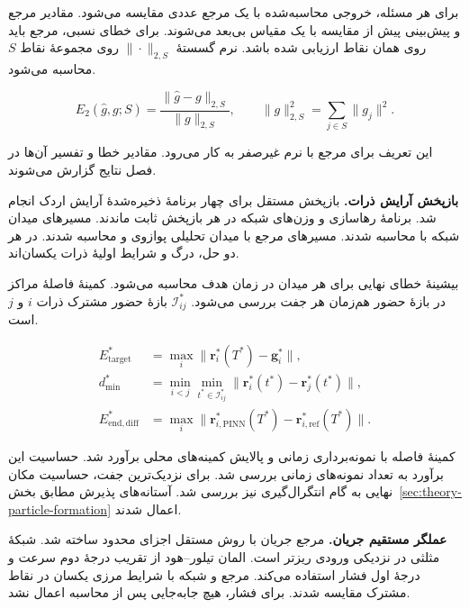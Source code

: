 \label{sec:theory-validation-metrics}

برای هر مسئله، خروجی محاسبه‌شده با یک مرجع عددی مقایسه می‌شود.
مقادیر مرجع و پیش‌بینی پیش از مقایسه با یک مقیاس بی‌بعد می‌شوند.
برای خطای نسبی، مرجع باید روی همان نقاط ارزیابی شده باشد.
نرم گسستهٔ $\|\cdot\|_{2,S}$ روی مجموعهٔ نقاط $S$ محاسبه می‌شود.

\begin{equation}
E_2(\widehat g,g;S)=
\frac{\|\widehat g-g\|_{2,S}}{\|g\|_{2,S}},
\qquad
\|g\|_{2,S}^2=\sum_{j\in S}\|g_j\|^2.
\label{eq:validation-relative-l2}
\end{equation}

این تعریف برای مرجع با نرم غیرصفر به کار می‌رود.
مقادیر خطا و تفسیر آن‌ها در فصل نتایج گزارش می‌شوند.

\textbf{بازپخش آرایش ذرات.}
بازپخش مستقل برای چهار برنامهٔ ذخیره‌شدهٔ آرایش اردک انجام شد.
برنامهٔ رهاسازی و وزن‌های شبکه در هر بازپخش ثابت ماندند.
مسیرهای میدان شبکه با  محاسبه شدند.
مسیرهای مرجع با میدان تحلیلی پوازوی و  محاسبه شدند.
در هر دو حل، درگ و شرایط اولیهٔ ذرات یکسان‌اند.

بیشینهٔ خطای نهایی برای هر میدان در زمان هدف محاسبه می‌شود.
کمینهٔ فاصلهٔ مراکز در بازهٔ حضور هم‌زمان هر جفت بررسی می‌شود.
$\mathcal I_{ij}^*$ بازهٔ حضور مشترک ذرات $i$ و $j$ است.

\begin{equation}
\begin{aligned}
E_{\mathrm{target}}^*
&=\max_i\|\mathbf r_i^*(T^*)-\mathbf g_i^*\|,\\
d_{\min}^*
&=\min_{i<j}\min_{t^*\in\mathcal I_{ij}^*}
  \|\mathbf r_i^*(t^*)-\mathbf r_j^*(t^*)\|,\\
E_{\mathrm{end,diff}}^*
&=\max_i\|\mathbf r_{i,\mathrm{PINN}}^*(T^*)
           -\mathbf r_{i,\mathrm{ref}}^*(T^*)\|.
\end{aligned}
\label{eq:validation-formation-errors}
\end{equation}

کمینهٔ فاصله با نمونه‌برداری زمانی و پالایش کمینه‌های محلی برآورد شد.
حساسیت این برآورد به تعداد نمونه‌های زمانی بررسی شد.
برای نزدیک‌ترین جفت، حساسیت مکان نهایی به گام انتگرال‌گیری نیز بررسی شد.
آستانه‌های پذیرش مطابق بخش~\ref{sec:theory-particle-formation} اعمال شدند.

\textbf{عملگر مستقیم جریان.}
مرجع جریان با روش مستقل اجزای محدود ساخته شد.
شبکهٔ مثلثی در نزدیکی ورودی ریزتر است.
المان تیلور–هود از تقریب درجهٔ دوم سرعت و درجهٔ اول فشار استفاده می‌کند.
مرجع و شبکه با شرایط مرزی یکسان در نقاط مشترک مقایسه شدند.
برای فشار، هیچ جابه‌جایی پس از محاسبه اعمال نشد.

